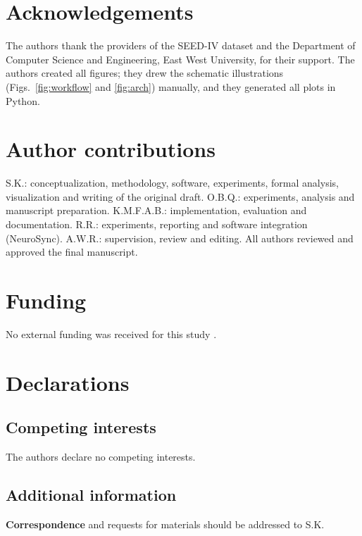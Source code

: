 \section*{Acknowledgements}
The authors thank the providers of the SEED-IV dataset and the Department of Computer Science and Engineering, East West University, for their support. The authors created all figures; they drew the schematic illustrations (Figs.~\ref{fig:workflow} and \ref{fig:arch}) manually, and they generated all plots in Python.

\section*{Author contributions}
S.K.: conceptualization, methodology, software, experiments, formal analysis, visualization and writing of the original draft. O.B.Q.: experiments, analysis and manuscript preparation. K.M.F.A.B.: implementation, evaluation and documentation. R.R.: experiments, reporting and software integration (NeuroSync). A.W.R.: supervision, review and editing. All authors reviewed and approved the final manuscript.

\section*{Funding}
No external funding was received for this study .

\section*{Declarations}
\subsection*{Competing interests}
The authors declare no competing interests.

\subsection*{Additional information}
\textbf{Correspondence} and requests for materials should be addressed to S.K.


